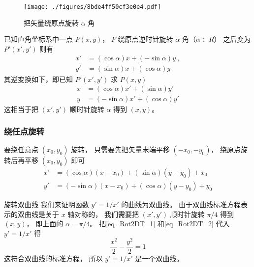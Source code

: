 

\begin{figure}[ht]
\centering
\texttt{[image: ./figures/8bde4ff50cf3e0e4.pdf]}
\caption{把矢量绕原点旋转 $\alpha$ 角} \label{fig_Rot2DT_1}
\end{figure}

已知直角坐标系中一点 $P(x,y)$， $P$ 绕原点逆时针旋转 $\alpha $ 角（$\alpha  \in R$） 之后变为 $P'(x',y')$ 则有
\begin{align}\label{eq_Rot2DT_1}
x' &= (\cos \alpha)x + (- \sin \alpha)y ~,\\
\label{eq_Rot2DT_2}
y' &= (\sin \alpha)x + (\cos \alpha)y
\end{align}
其逆变换如下，即已知 $P'(x',y')$ 求 $P(x,y)$ 
\begin{align}\label{eq_Rot2DT_3}
x &= ( \cos \alpha  )x' + ( \sin \alpha  )y' \\
\label{eq_Rot2DT_4}
y &= ( - \sin \alpha)x' + ( \cos \alpha )y'
\end{align}
这相当于把 $(x', y')$ 顺时针旋转 $\alpha$ 得到 $(x, y)$。

\subsubsection{绕任点旋转}
要绕任意点 $(x_0, y_0)$ 旋转， 只需要先把矢量末端平移 $(-x_0, -y_0)$， 绕原点旋转后再平移 $(x_0, y_0)$ 即可
\begin{equation}\label{eq_Rot2DT_5}
\begin{aligned}
x' &= ( \cos \alpha  )(x-x_0) + ( \sin \alpha  )(y-y_0) + x_0 \\
y' &= ( - \sin \alpha)(x-x_0) + ( \cos \alpha )(y-y_0) + y_0
\end{aligned}
\end{equation}

\begin{example}{旋转双曲线}
我们来证明函数 $y' = 1/x'$ 的曲线为双曲线。 由于双曲线标准方程表示的双曲线是关于 $x$ 轴对称的， 我们需要把 $(x', y')$ 顺时针旋转 $\pi/4$ 得到 $(x, y)$， 即上面的 $\alpha = \pi/4$。 把\autoref{eq_Rot2DT_1} 和\autoref{eq_Rot2DT_2} 代入 $y' = 1/x'$ 得
\begin{equation}
\frac{x^2}{2} - \frac{y^2}{2} = 1
\end{equation}
这符合双曲线的标准方程， 所以 $y' = 1/x'$ 是一个双曲线。
\end{example}

